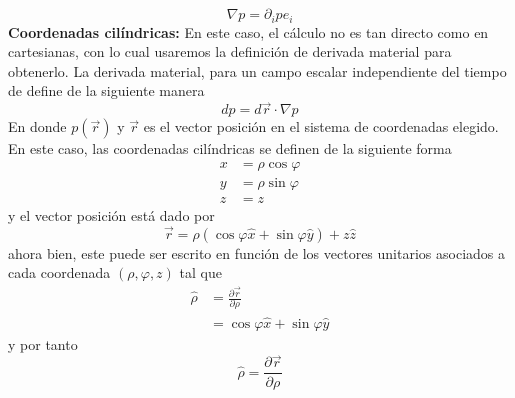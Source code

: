 \documentclass[11pt,letterpaper]{article}
\begin{document}
\begin{equation}
    \nabla p = \partial_i p \hat{e_i}
\end{equation}
\textbf{Coordenadas cilíndricas:} En este caso, el cálculo no es tan directo como en cartesianas, con lo cual usaremos la definición de derivada material para obtenerlo. La derivada material, para un campo escalar independiente del tiempo de define de la siguiente manera
\begin{equation}
    dp=d\vec{r}\cdot \nabla p
\end{equation}
En donde $p(\vec{r})$ y $\vec{r}$ es el vector posición en el sistema de coordenadas elegido. En este caso, las coordenadas cilíndricas se definen de la siguiente forma
\begin{align*}
    x & =\rho\cos{\varphi} \\
    y & = \rho \sin{\varphi} \\
    z & = z
\end{align*}
y el vector posición está dado por
\begin{equation}
    \vec{r}=\rho(\cos{\varphi}\hat{x} + \sin{\varphi}\hat{y})+z\hat{z}
\end{equation}
ahora bien, este puede ser escrito en función de los vectores unitarios asociados a cada coordenada $(\rho,\varphi,z)$ tal que
\begin{align*}
    \hat{\rho}& =\frac{\partial \vec{r}}{\partial \rho} \\
& = \cos{\varphi}\hat{x} + \sin{\varphi}\hat{y}
\end{align*}
y por tanto
\begin{equation}
    \hat{\rho} = \frac{\partial \vec{r}}{\partial \rho }
\end{equation}
\end{document}
